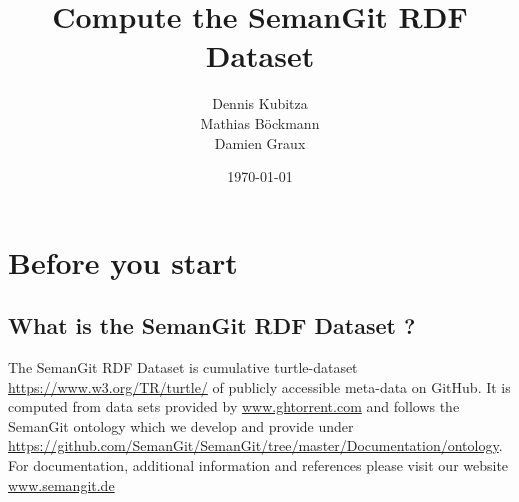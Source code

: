 \documentclass[11pt]{article}
\title{\textbf{Compute the SemanGit RDF Dataset}}
\author{Dennis Kubitza \\ Mathias B\"ockmann \\ Damien Graux}
\date{\today}
\begin{document}
\maketitle
\tableofcontents
\newpage
\section{Before you start}
\subsection{What is the SemanGit RDF Dataset ?}
The SemanGit RDF Dataset is cumulative turtle-dataset \url{https://www.w3.org/TR/turtle/} of publicly accessible meta-data on GitHub. It is computed from data sets provided by \url{www.ghtorrent.com} \cite{ghtorrent} and follows the SemanGit ontology which we develop and provide under \url{https://github.com/SemanGit/SemanGit/tree/master/Documentation/ontology}. For documentation, additional information and references please visit our website \url{www.semangit.de}
\end{document}
